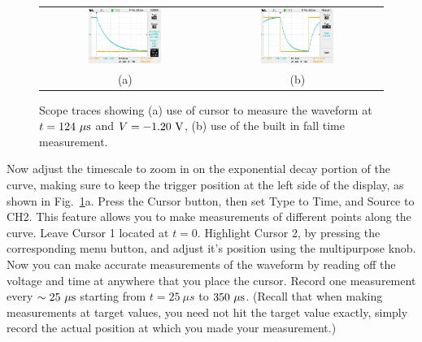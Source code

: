 \begin{figure}[htbp]
\begin{center}
\begin{tabular}{cc}
\includegraphics[width=0.45\textwidth]{figs/labs/transients/rc_cursor.jpg} &
\includegraphics[width=0.45\textwidth]{figs/labs/transients/rc_falltime.jpg} \\
(a) & (b) \\
\end{tabular}
\caption{Scope traces showing (a) use of cursor to measure the waveform at $t=124~\rm \mu s$ and $V=-1.20~\rm V$, (b) use of the built in fall time measurement.}
\label{fig:cursor_falltime}
\end{center}
\end{figure}

Now adjust the timescale to zoom in on the exponential decay portion
of the curve, making sure to keep the trigger position at the left
side of the display, as shown in Fig.~\ref{fig:cursor_falltime}a.
Press the Cursor button, then set Type to Time, and Source to CH2.
This feature allows you to make measurements of different points along
the curve.  Leave Cursor 1 located at $t=0$.  Highlight Cursor 2, by
pressing the corresponding menu button, and adjust it's position using
the multipurpose knob.  Now you can make accurate measurements of the
waveform by reading off the voltage and time at anywhere that you
place the cursor.  Record one measurement every $\sim 25~\rm \mu s$
starting from $t=25~\mu s$ to $350~\rm \mu s$.  (Recall that when
making measurements at target values, you need not hit the target
value exactly, simply record the actual position at which you made
your measurement.)

